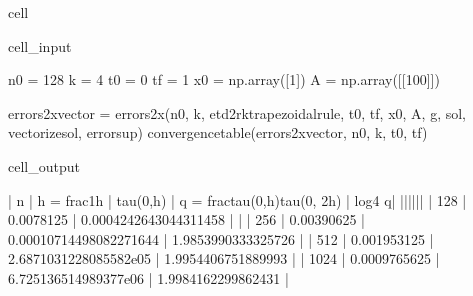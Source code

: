 \documentclass[letterpaper,10pt,english]{jupyterBook}
\begin{document}
\begin{sphinxuseclass}{cell}\begin{sphinxVerbatimInput}

\begin{sphinxuseclass}{cell_input}
\begin{sphinxVerbatim}[commandchars=\\\{\}]
n0 = 128
k = 4
t0 = 0
tf = 1
x0 = np.array([1])
A = np.array([[100]])

errors\PYGZus{}2x\PYGZus{}vector = errors\PYGZus{}2x(n0, k, etd2rk\PYGZus{}trapezoidal\PYGZus{}rule, t0, tf, x0, A, g, sol, vectorize\PYGZus{}sol, error\PYGZus{}sup)
convergence\PYGZus{}table(errors\PYGZus{}2x\PYGZus{}vector, n0, k, t0, tf)
\end{sphinxVerbatim}

\end{sphinxuseclass}\end{sphinxVerbatimInput}
\begin{sphinxVerbatimOutput}

\begin{sphinxuseclass}{cell_output}
\begin{sphinxVerbatim}[commandchars=\\\{\}]
| n | h = \PYGZdl{}\PYGZbs{}frac\PYGZob{}1\PYGZcb{}\PYGZob{}h\PYGZcb{}\PYGZdl{} | \PYGZdl{}\PYGZbs{}tau(0,h)\PYGZdl{} | q = \PYGZdl{}\PYGZbs{}frac\PYGZob{}tau(0,h)\PYGZcb{}\PYGZob{}tau(0, 2h)\PYGZcb{}\PYGZdl{} | \PYGZdl{}log\PYGZus{}4 \PYGZca{}q\PYGZdl{}|
|\PYGZhy{}\PYGZhy{}\PYGZhy{}|\PYGZhy{}\PYGZhy{}\PYGZhy{}\PYGZhy{}\PYGZhy{}\PYGZhy{}\PYGZhy{}\PYGZhy{}\PYGZhy{}\PYGZhy{}\PYGZhy{}\PYGZhy{}\PYGZhy{}\PYGZhy{}\PYGZhy{}\PYGZhy{}\PYGZhy{}|\PYGZhy{}\PYGZhy{}\PYGZhy{}\PYGZhy{}\PYGZhy{}\PYGZhy{}\PYGZhy{}\PYGZhy{}\PYGZhy{}\PYGZhy{}\PYGZhy{}|\PYGZhy{}\PYGZhy{}\PYGZhy{}\PYGZhy{}\PYGZhy{}\PYGZhy{}\PYGZhy{}\PYGZhy{}\PYGZhy{}\PYGZhy{}\PYGZhy{}\PYGZhy{}\PYGZhy{}\PYGZhy{}\PYGZhy{}\PYGZhy{}\PYGZhy{}\PYGZhy{}\PYGZhy{}\PYGZhy{}\PYGZhy{}\PYGZhy{}\PYGZhy{}\PYGZhy{}\PYGZhy{}\PYGZhy{}\PYGZhy{}\PYGZhy{}\PYGZhy{}\PYGZhy{}\PYGZhy{}\PYGZhy{}\PYGZhy{}|\PYGZhy{}\PYGZhy{}\PYGZhy{}\PYGZhy{}\PYGZhy{}\PYGZhy{}\PYGZhy{}|
 | 128 | 0.0078125 | 0.0004242643044311458 | \PYGZhy{} | 
 | 256 | 0.00390625 | 0.00010714498082271644 | 1.9853990333325726 | 
 | 512 | 0.001953125 | 2.6871031228085582e\PYGZhy{}05 | 1.9954406751889993 | 
 | 1024 | 0.0009765625 | 6.725136514989377e\PYGZhy{}06 | 1.9984162299862431 | 
\end{sphinxVerbatim}

\end{sphinxuseclass}\end{sphinxVerbatimOutput}

\end{sphinxuseclass}
\end{document}
